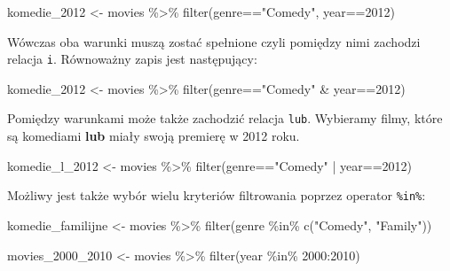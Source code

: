 \documentclass[
  letterpaper,
  DIV=11,
  numbers=noendperiod]{scrreprt}
\newenvironment{Shaded}{\begin{snugshade}}{\end{snugshade}}
\newcommand{\DecValTok}[1]{\textcolor[rgb]{0.68,0.00,0.00}{#1}}
\newcommand{\FunctionTok}[1]{\textcolor[rgb]{0.28,0.35,0.67}{#1}}
\newcommand{\NormalTok}[1]{\textcolor[rgb]{0.00,0.23,0.31}{#1}}
\newcommand{\OtherTok}[1]{\textcolor[rgb]{0.00,0.23,0.31}{#1}}
\newcommand{\SpecialCharTok}[1]{\textcolor[rgb]{0.37,0.37,0.37}{#1}}
\newcommand{\StringTok}[1]{\textcolor[rgb]{0.13,0.47,0.30}{#1}}
\begin{document}
\begin{Shaded}
\begin{Highlighting}[]
\NormalTok{komedie\_2012 }\OtherTok{\textless{}{-}}\NormalTok{ movies }\SpecialCharTok{\%\textgreater{}\%}
  \FunctionTok{filter}\NormalTok{(genre}\SpecialCharTok{==}\StringTok{"Comedy"}\NormalTok{, year}\SpecialCharTok{==}\DecValTok{2012}\NormalTok{)}
\end{Highlighting}
\end{Shaded}

Wówczas oba warunki muszą zostać spełnione czyli pomiędzy nimi zachodzi
relacja \texttt{i}. Równoważny zapis jest następujący:

\begin{Shaded}
\begin{Highlighting}[]
\NormalTok{komedie\_2012 }\OtherTok{\textless{}{-}}\NormalTok{ movies }\SpecialCharTok{\%\textgreater{}\%}
  \FunctionTok{filter}\NormalTok{(genre}\SpecialCharTok{==}\StringTok{"Comedy"} \SpecialCharTok{\&}\NormalTok{ year}\SpecialCharTok{==}\DecValTok{2012}\NormalTok{)}
\end{Highlighting}
\end{Shaded}

Pomiędzy warunkami może także zachodzić relacja \texttt{lub}. Wybieramy
filmy, które są komediami \textbf{lub} miały swoją premierę w 2012 roku.

\begin{Shaded}
\begin{Highlighting}[]
\NormalTok{komedie\_l\_2012 }\OtherTok{\textless{}{-}}\NormalTok{ movies }\SpecialCharTok{\%\textgreater{}\%}
  \FunctionTok{filter}\NormalTok{(genre}\SpecialCharTok{==}\StringTok{"Comedy"} \SpecialCharTok{|}\NormalTok{ year}\SpecialCharTok{==}\DecValTok{2012}\NormalTok{)}
\end{Highlighting}
\end{Shaded}

Możliwy jest także wybór wielu kryteriów filtrowania poprzez operator
\texttt{\%in\%}:

\begin{Shaded}
\begin{Highlighting}[]
\NormalTok{komedie\_familijne }\OtherTok{\textless{}{-}}\NormalTok{ movies }\SpecialCharTok{\%\textgreater{}\%}
  \FunctionTok{filter}\NormalTok{(genre }\SpecialCharTok{\%in\%} \FunctionTok{c}\NormalTok{(}\StringTok{"Comedy"}\NormalTok{, }\StringTok{"Family"}\NormalTok{))}

\NormalTok{movies\_2000\_2010 }\OtherTok{\textless{}{-}}\NormalTok{ movies }\SpecialCharTok{\%\textgreater{}\%}
  \FunctionTok{filter}\NormalTok{(year }\SpecialCharTok{\%in\%} \DecValTok{2000}\SpecialCharTok{:}\DecValTok{2010}\NormalTok{)}
\end{Highlighting}
\end{Shaded}
\end{document}
